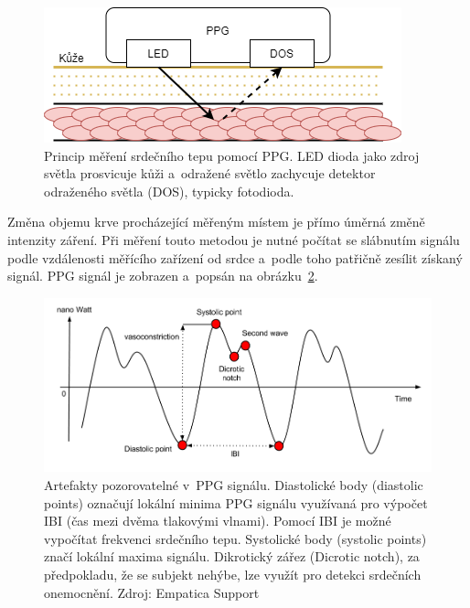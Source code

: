         \begin{figure}[H]
            \centering
            \includegraphics[width=\textwidth]{obrazky-figures/ppg_scheme.png}
            \caption{Princip měření srdečního tepu pomocí PPG. LED dioda jako zdroj světla prosvicuje kůži a~odražené světlo zachycuje detektor odraženého světla (DOS), typicky fotodioda.}
            \label{fig:ppg_scheme}
        \end{figure}

        Změna objemu krve procházející měřeným místem je přímo úměrná změně intenzity záření. Při měření touto metodou je nutné počítat se slábnutím signálu podle vzdálenosti měřícího zařízení od srdce a~podle toho patřičně zesílit získaný signál. PPG signál je zobrazen a~popsán na obrázku~\ref{fig:ppg_fig}.
        
        \begin{figure}[H]
            \centering
            \includegraphics[width=\textwidth]{obrazky-figures/ppg.png}
            \caption{Artefakty pozorovatelné v~PPG signálu. Diastolické body (diastolic points) označují lokální minima PPG signálu využívaná pro výpočet IBI (čas mezi dvěma tlakovými vlnami). Pomocí IBI je možné vypočítat frekvenci srdečního tepu. Systolické body (systolic points) značí lokální maxima signálu. Dikrotický zářez (Dicrotic notch), za předpokladu, že se subjekt nehýbe, lze využít pro detekci srdečních onemocnění. Zdroj: Empatica Support~\cite{empatica_support}}
            \label{fig:ppg_fig}
        \end{figure}
        
